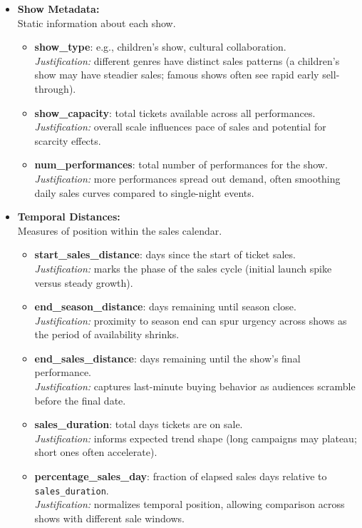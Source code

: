 \documentclass[a4paper,12pt]{report}  %
\begin{document}
\begin{itemize}
      \item \textbf{Show Metadata:}\\
        Static information about each show.
        \begin{itemize}
          \item \textbf{show\_type}: e.g., children’s show, cultural collaboration.  \\
            \emph{Justification:} different genres have distinct sales patterns (a children’s show may have steadier sales; famous shows often see rapid early sell-through).
          \item \textbf{show\_capacity}: total tickets available across all performances.  \\
            \emph{Justification:} overall scale influences pace of sales and potential for scarcity effects.
          \item \textbf{num\_performances}: total number of performances for the show.  \\
            \emph{Justification:} more performances spread out demand, often smoothing daily sales curves compared to single-night events.
        \end{itemize}

      \item \textbf{Temporal Distances:}\\
        Measures of position within the sales calendar.
        \begin{itemize}
          \item \textbf{start\_sales\_distance}: days since the start of ticket sales.  \\
            \emph{Justification:} marks the phase of the sales cycle (initial launch spike versus steady growth).
          \item \textbf{end\_season\_distance}: days remaining until season close.  \\
            \emph{Justification:} proximity to season end can spur urgency across shows as the period of availability shrinks.
          \item \textbf{end\_sales\_distance}: days remaining until the show’s final performance.  \\
            \emph{Justification:} captures last-minute buying behavior as audiences scramble before the final date.
          \item \textbf{sales\_duration}: total days tickets are on sale.  \\
            \emph{Justification:} informs expected trend shape (long campaigns may plateau; short ones often accelerate).
          \item \textbf{percentage\_sales\_day}: fraction of elapsed sales days relative to \texttt{sales\_duration}.  \\
            \emph{Justification:} normalizes temporal position, allowing comparison across shows with different sale windows.
        \end{itemize}
    \end{itemize}
\end{document}
